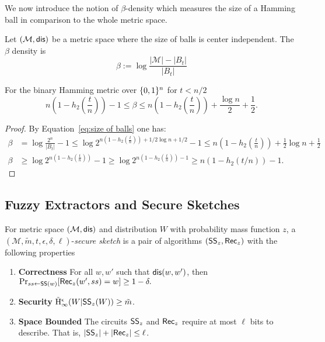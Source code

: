 \noindent
We now introduce the notion of $\beta$-density which measures the size of a Hamming ball in comparison to the whole metric space.
\begin{definition}
Let $(\mathcal{M}, \mathsf{dis})$ be a metric space where the size of balls is center independent.  The $\beta$ density is
\[
\beta := \log{\frac{|\mathcal{M}|- |B_t|}{|B_t|}} 
\]
\label{def:b density}
\end{definition}
\begin{claim} 
For the binary Hamming metric over $\{0, 1\}^n$ for $t<n/2$
\[
n\left(1-h_2\left(\frac{t}{n}\right)\right)-1 \le \beta \le n\left(1-h_2\left(\frac{t}{n}\right)\right)+\frac{\log{n}}{2}+\frac{1}{2}.
\]

\end{claim}

\begin{proof}
By Equation~\ref{eq:size of balls} one has: 
\begin{align*}
\beta & = \log{\frac{2^n}{|B_t|} -1} \le \log{2^{n\left(1-h_2\left(\frac{t}{n}\right)\right) + 1/2 \log{n}+1/2} -1} \le n\left(1-h_2\left(\frac{t}{n}\right)\right) + \frac{1}{2}\log{n}+ \frac{1}{2}\\
\beta&\ge \log{2^{n\left(1-h_2\left(\frac{t}{n}\right)\right)} -1} \ge \log{2^{n\left(1-h_2\left(\frac{t}{n}\right)\right)-1} } \ge n(1-h_2(t/n))-1.
\end{align*}
\end{proof}


    \subsection{Fuzzy Extractors and Secure Sketches}
\begin{definition}
For metric space $(\mathcal{M}, \mathsf{dis})$ and distribution $W$ with probability mass function $z$, a $(\mathcal{M}, \tilde{m}, t, \epsilon, \delta, \ell)$-\emph{secure sketch} is a pair of algorithms $({\mathsf{SS}}_z, {\mathsf{Rec}}_z)$ with the following properties 
\begin{enumerate} 
\itemsep0em
\item \textbf{Correctness} For all $w, w'$ such that $\mathsf{dis}(w, w')$, then $\Pr_{ss \leftarrow {\ensuremath{\mathsf{SS}}}(w)}[{\mathsf{Rec}}_z(w', ss) = w]\ge 1-\delta.$
\item \textbf{Security}  $\tilde{\mathrm{H}}_\infty^\epsilon(W | {\mathsf{SS}}_z(W)) \ge \tilde{m}$.
\item \textbf{Space Bounded} The circuits ${\mathsf{SS}}_z$ and ${\mathsf{Rec}}_z$ require at most $\ell$ bits to describe.  That is, $|{\mathsf{SS}}_z| +|{\mathsf{Rec}}_z|\le \ell$.
\end{enumerate}
\end{definition}

